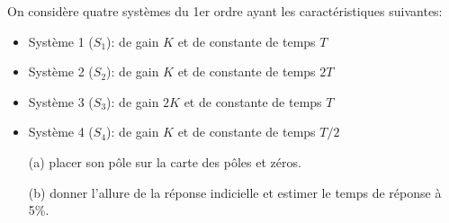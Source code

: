 \clearpage
On considère quatre systèmes du 1er ordre ayant les caractéristiques suivantes:
\begin{itemize}
    \item Système 1 ($S_1$): de gain $K$ et de constante de temps $T$
    \item Système 2 ($S_2$): de gain $K$ et de constante de temps $2T$
    \item Système 3 ($S_3$): de gain $2K$ et de constante de temps $T$
    \item Système 4 ($S_4$): de gain $K$ et de constante de temps $T/2$
\end{itemize}
\begin{itemize}
    \item[(a)] placer son pôle sur la carte des pôles et zéros.
    \item[(b)] donner l'allure de la réponse indicielle et estimer le temps
               de réponse à 5\%.
\end{itemize}
